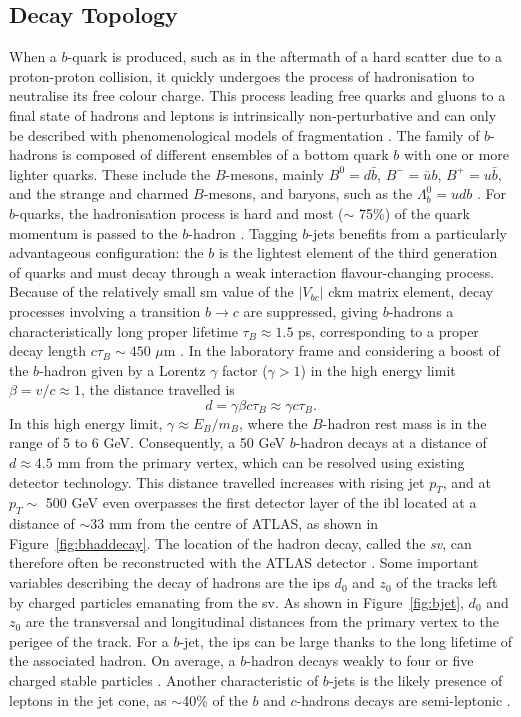 \subsection{Decay Topology}
When a $b$-quark is produced, such as in the aftermath of a hard scatter due to a proton-proton collision, it quickly undergoes the process of hadronisation to neutralise its free colour charge. This process leading free quarks and gluons to a final state of hadrons and leptons is intrinsically non-perturbative and can only be described with phenomenological models of fragmentation \cite{Webber:419784}. The family of $b$-hadrons is composed of different ensembles of a bottom quark $b$ with one or more lighter quarks. These include the $B$-mesons, mainly $B^0=d\bar{b}$, $B^-=\bar{u}b$, $B^+=u\bar{b}$, and the strange and charmed $B$-mesons, and baryons, such as the $\Lambda_b^0=udb$ \cite{ATL-PHYS-PUB-2014-008}. For $b$-quarks, the hadronisation process is hard and most ($\sim$ 75\%) of the quark momentum is passed to the $b$-hadron \cite{Webber:419784}. Tagging $b$-jets benefits from a particularly advantageous configuration: the $b$ is the lightest element of the third generation of quarks and must decay through a weak interaction flavour-changing process. Because of the relatively small \gls{sm} value of the $|V_{bc}|$ \gls{ckm} matrix element, decay processes involving a transition $b \rightarrow c$ are suppressed, giving $b$-hadrons a characteristically long proper lifetime $\tau_B \approx 1.5$ ps, corresponding to a proper decay length $c\tau_{B} \sim 450$ $\mu$m \cite{Tanabashi:2018oca}. In the laboratory frame and considering a boost of the $b$-hadron given by a Lorentz $\gamma$ factor ($\gamma > 1$) in the high energy limit $\beta = v/c \approx 1$, the distance travelled is \[d = \gamma \beta c \tau_B \approx \gamma c \tau_B.\] In this high energy limit, $\gamma \approx E_B / m_B$, where the $B$-hadron rest mass is in the range of 5 to 6 GeV. Consequently, a 50 GeV $b$-hadron decays at a distance of $d \approx 4.5$ mm from the primary vertex, which can be resolved using existing detector technology. This distance travelled increases with rising jet $p_T$, and at $p_T \sim$ 500 GeV even overpasses the first detector layer of the \gls{ibl} located at a distance of $\sim$33 mm from the centre of ATLAS, as shown in Figure~\ref{fig:bhaddecay}. The location of the hadron decay, called the \textit{\gls{sv}}, can therefore often be reconstructed with the ATLAS detector \cite{Aad:2019aic}. Some important variables describing the decay of hadrons are the \glspl{ip} $d_0$ and $z_0$ of the tracks left by charged particles emanating from the \gls{sv}. As shown in Figure~\ref{fig:bjet}, $d_0$ and $z_0$ are the transversal and longitudinal distances from the primary vertex to the perigee of the track. For a $b$-jet, the \glspl{ip} can be large thanks to the long lifetime of the associated hadron. On average, a $b$-hadron decays weakly to four or five charged stable particles \cite{ATL-PHYS-PUB-2014-008}. Another characteristic of $b$-jets is the likely presence of leptons in the jet cone, as $\sim$40\% of the $b$ and $c$-hadrons decays are semi-leptonic \cite{Tanabashi:2018oca}. \\

